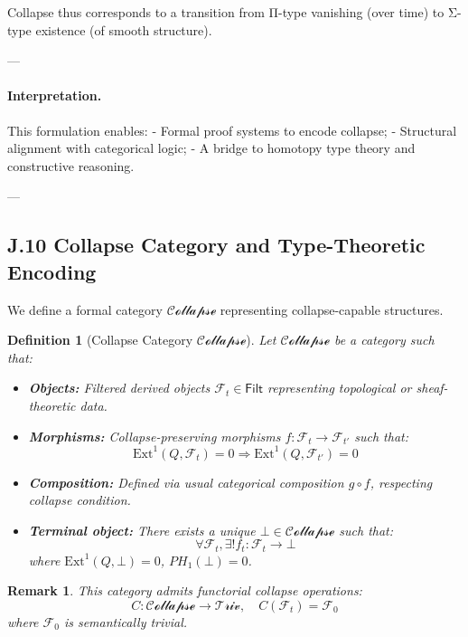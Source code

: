 \documentclass[11pt]{article}
\newtheorem{definition}[theorem]{Definition}
\newtheorem{remark}[theorem]{Remark}
\begin{document}
\begin{axiom}
\begin{axiom}
Collapse thus corresponds to a transition from Π-type vanishing (over time) to Σ-type existence (of smooth structure).

---

\paragraph{Interpretation.}
This formulation enables:
- Formal proof systems to encode collapse;
- Structural alignment with categorical logic;
- A bridge to homotopy type theory and constructive reasoning.

---


\subsection*{J.10 Collapse Category and Type-Theoretic Encoding}

We define a formal category \(\mathcal{Collapse}\) representing collapse-capable structures.

\begin{definition}[Collapse Category \(\mathcal{Collapse}\)]
Let \(\mathcal{Collapse}\) be a category such that:
\begin{itemize}
  \item \textbf{Objects:} Filtered derived objects \(\mathcal{F}_t \in \mathsf{Filt}\) representing topological or sheaf-theoretic data.
  \item \textbf{Morphisms:} Collapse-preserving morphisms \(f: \mathcal{F}_t \to \mathcal{F}_{t'}\) such that:
    \[
    \mathrm{Ext}^1(Q, \mathcal{F}_t) = 0 \Rightarrow \mathrm{Ext}^1(Q, \mathcal{F}_{t'}) = 0
    \]
  \item \textbf{Composition:} Defined via usual categorical composition \(g \circ f\), respecting collapse condition.
  \item \textbf{Terminal object:} There exists a unique \(\bot \in \mathcal{Collapse}\) such that:
    \[
    \forall \mathcal{F}_t, \exists! f_t : \mathcal{F}_t \to \bot
    \]
    where \(\mathrm{Ext}^1(Q, \bot) = 0\), \(PH_1(\bot) = 0\).
\end{itemize}
\end{definition}

\begin{remark}
This category admits functorial collapse operations:
\[
C: \mathcal{Collapse} \to \mathcal{Triv}, \quad C(\mathcal{F}_t) = \mathcal{F}_0
\]
where \(\mathcal{F}_0\) is semantically trivial.
\end{remark}


\end{axiom}
\end{axiom}
\end{document}
